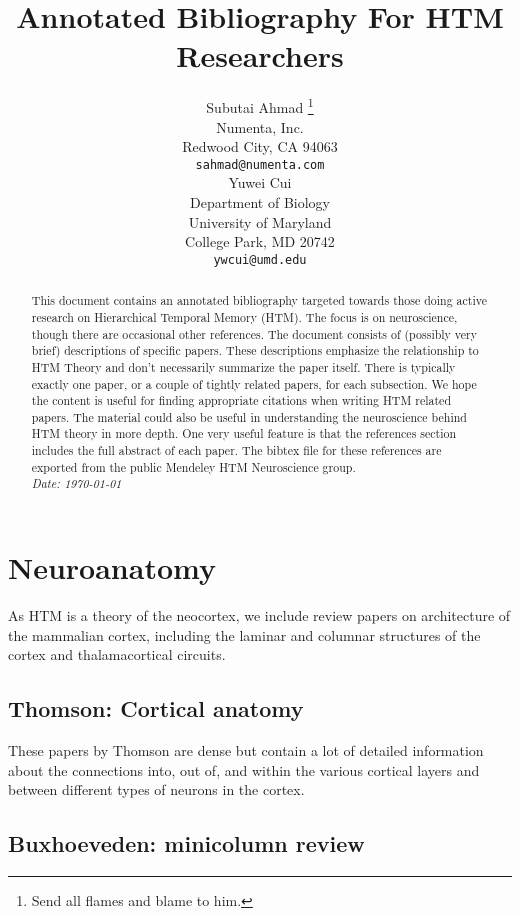 \documentclass{article} %
\title{Annotated Bibliography For HTM Researchers}
\author{
Subutai Ahmad \thanks{Send all flames and blame to him.} \\
Numenta, Inc.\\
Redwood City, CA 94063 \\
\texttt{sahmad@numenta.com} \\
\And
Yuwei Cui \\
Department of Biology\\
University of Maryland\\
College Park, MD 20742\\
\texttt{ywcui@umd.edu} \\
}
\begin{document}
\maketitle

\begin{abstract}
This document contains an annotated bibliography targeted towards those doing
active research on Hierarchical Temporal Memory (HTM). The focus is on
neuroscience, though there are occasional other references. The document consists
of (possibly very brief) descriptions of specific papers. These descriptions
emphasize the relationship to HTM Theory and don't necessarily summarize the
paper itself. There is typically exactly one paper, or a couple of tightly
related papers, for each subsection. We hope the content is useful for finding
appropriate citations when writing HTM related papers. The material
could also be useful in understanding the neuroscience behind HTM theory in more
depth. One very useful feature is that the references section includes the full
abstract of each paper. The bibtex file for these references are exported from
the public Mendeley HTM Neuroscience group.
 \\

\emph{Date: \today}
\end{abstract}

\clearpage


\renewcommand{\contentsname}{Table of Contents}
\setcounter{tocdepth}{2}
\tableofcontents

\clearpage

\section{Neuroanatomy}

As HTM is a theory of the neocortex, we include review papers on architecture
of the mammalian cortex, including the laminar and columnar structures of the
cortex and thalamacortical circuits.

\subsection{Thomson: Cortical anatomy}

These papers by Thomson \cite{Thomson2003,Thomson2007,Thomson2010} are dense
but contain a lot of detailed information about the connections into, out of,
and within the various cortical layers and between different types of neurons in the cortex.

\subsection{Buxhoeveden: minicolumn review}
\end{document}
